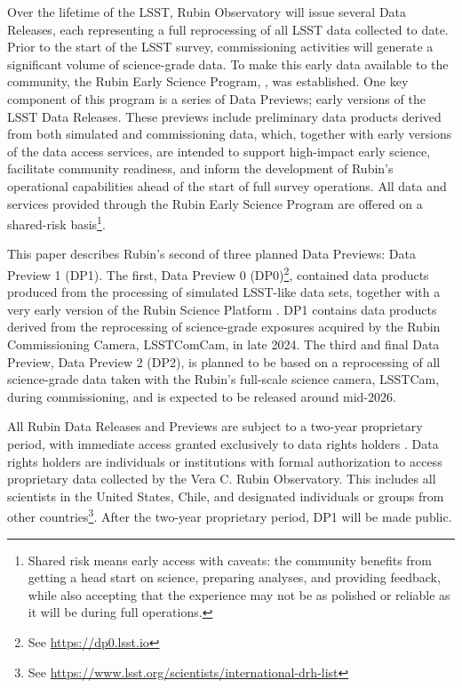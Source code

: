 Over the lifetime of the \gls{LSST}, Rubin Observatory will issue several Data Releases, each representing a full reprocessing of all \gls{LSST} data collected to date.
Prior to the start of the \gls{LSST} survey, commissioning activities will generate a significant volume of science-grade data.
To make this early data available to the community, the Rubin Early Science Program, \citep{RTN-011}, was established.
One key component of this program is a series of Data Previews; early versions of the \gls{LSST} Data Releases.
These previews include preliminary data products derived from both simulated and commissioning data, which, together with early versions of the data access services, are intended to support high-impact early science, facilitate community readiness, and inform the development of Rubin’s operational capabilities ahead of the start of full survey operations.
All data and services provided through the Rubin Early Science Program are offered on a shared-risk basis\footnote{Shared risk means early access with caveats: the community benefits from getting a head start on science, preparing analyses, and providing feedback, while also accepting that the experience may not be as polished or reliable as it will be during full operations.}.

This paper describes Rubin's second of three planned Data Previews: Data Preview 1 (\gls{DP1}).
The first, Data Preview 0 (\gls{DP0})\footnote{See \url{https://dp0.lsst.io}}, contained data products produced from the processing of simulated LSST-like data sets, together with a very early version of the Rubin \gls{Science Platform} \citep{LSE-319}.
DP1 contains data products derived from the reprocessing of science-grade exposures acquired by the Rubin Commissioning \gls{Camera}, \gls{LSSTComCam}, in late 2024.
The third and final Data Preview,  Data Preview 2 (\gls{DP2}), is planned to be based on a reprocessing of all science-grade data taken with the Rubin's full-scale science \gls{camera}, LSSTCam, during commissioning, and is expected to be released around mid-2026.

All Rubin Data Releases and Previews are subject to a two-year proprietary period, with immediate access granted exclusively to data rights holders \citep{rdo-013}.
Data rights holders are individuals or institutions with formal authorization to access proprietary data collected by the Vera C. Rubin Observatory.
This includes all scientists in the United States, Chile, and designated individuals or groups from other countries\footnote{See \url{https://www.lsst.org/scientists/international-drh-list}}.
After the two-year proprietary period, \gls{DP1} will be made public.

